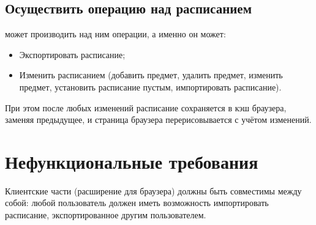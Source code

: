 		\subsection{Осуществить операцию над расписанием}
			 может производить над ним операции, а именно он может:
			\begin{itemize}
				\item Экспортировать расписание;
					
				\item Изменить расписанием (добавить предмет, удалить предмет, изменить предмет, установить расписание пустым, импортировать расписание).
			\end{itemize}
			
			При этом после любых изменений расписание сохраняется в кэш браузера, заменяя предыдущее, и страница браузера перерисовывается с учётом изменений.
	\section{Нефункциональные требования}
		Клиентские части (расширение для браузера) должны быть совместимы между собой: любой пользователь должен иметь возможность импортировать расписание, экспортированное другим пользователем.
